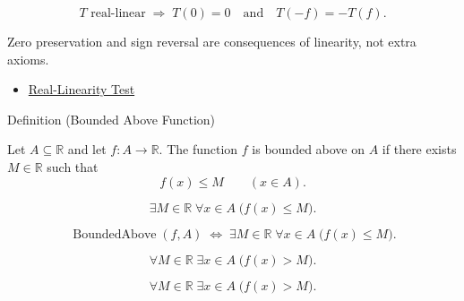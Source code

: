 \begin{remark*}
\[
  T\text{ real-linear}
  \;\Longrightarrow\;
  T(0)=0\quad\text{and}\quad T(-f)=-T(f).
\]
\end{remark*}

\begin{remark*}[Interpretation]
Zero preservation and sign reversal are consequences of linearity, not extra
axioms.
\end{remark*}

\begin{dependencies}
\begin{itemize}
  \item \hyperref[prop:real-linear-rule-test]{Real-Linearity Test}
\end{itemize}
\end{dependencies}


\begin{definitionbox}{Definition (Bounded Above Function)}
\begin{definition}
\label{def:function-bounded-above}
Let $A\subseteq\mathbb{R}$ and let $f:A\to\mathbb{R}$.  The function
$f$ is bounded above on $A$ if there exists $M\in\mathbb{R}$ such that
\[
  f(x)\leq M
  \qquad (x\in A).
\]
\end{definition}
\end{definitionbox}

\begin{remark*}
\[
  \exists M\in\mathbb{R}\;\forall x\in A\;\bigl(f(x)\leq M\bigr).
\]
\end{remark*}

\begin{remark*}
\[
  \operatorname{BoundedAbove}(f,A)
  \;\Longleftrightarrow\;
  \exists M\in\mathbb{R}\;\forall x\in A\;\bigl(f(x)\leq M\bigr).
\]
\end{remark*}

\begin{remark*}
\[
  \forall M\in\mathbb{R}\;\exists x\in A\;\bigl(f(x)>M\bigr).
\]
\end{remark*}

\begin{remark*}
\[
  \forall M\in\mathbb{R}\;\exists x\in A\;\bigl(f(x)>M\bigr).
\]
\end{remark*}



